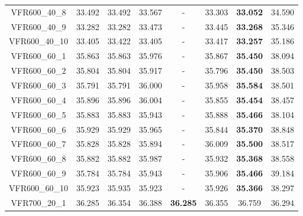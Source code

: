 \begin{tabular}{cc|ccc|ccc}
VFR600\_40\_8      & 33.492           & 33.492           & 33.567           & -                & 33.303           & {\bf 33.052}     & 34.590          \\ 
VFR600\_40\_9      & 33.282           & 33.282           & 33.473           & -                & 33.445           & {\bf 33.268}     & 35.346          \\ 
VFR600\_40\_10     & 33.405           & 33.422           & 33.405           & -                & 33.417           & {\bf 33.257}     & 35.186          \\ 
VFR600\_60\_1      & 35.863           & 35.863           & 35.976           & -                & 35.867           & {\bf 35.450}     & 38.094          \\ 
VFR600\_60\_2      & 35.804           & 35.804           & 35.917           & -                & 35.796           & {\bf 35.450}     & 38.503          \\ 
VFR600\_60\_3      & 35.791           & 35.791           & 36.000           & -                & 35.958           & {\bf 35.584}     & 38.501          \\ 
VFR600\_60\_4      & 35.896           & 35.896           & 36.004           & -                & 35.855           & {\bf 35.454}     & 38.457          \\ 
VFR600\_60\_5      & 35.883           & 35.883           & 35.943           & -                & 35.888           & {\bf 35.466}     & 38.104          \\ 
VFR600\_60\_6      & 35.929           & 35.929           & 35.965           & -                & 35.844           & {\bf 35.370}     & 38.848          \\ 
VFR600\_60\_7      & 35.828           & 35.828           & 35.894           & -                & 36.009           & {\bf 35.500}     & 38.517          \\ 
VFR600\_60\_8      & 35.882           & 35.882           & 35.987           & -                & 35.932           & {\bf 35.368}     & 38.558          \\ 
VFR600\_60\_9      & 35.784           & 35.784           & 35.943           & -                & 35.906           & {\bf 35.466}     & 39.184          \\ 
VFR600\_60\_10     & 35.923           & 35.935           & 35.923           & -                & 35.926           & {\bf 35.366}     & 38.297          \\ 
VFR700\_20\_1      & 36.285           & 36.354           & 36.388           & {\bf 36.285}     & 36.355           & 36.759           & 36.294          \\ 

\end{tabular}
